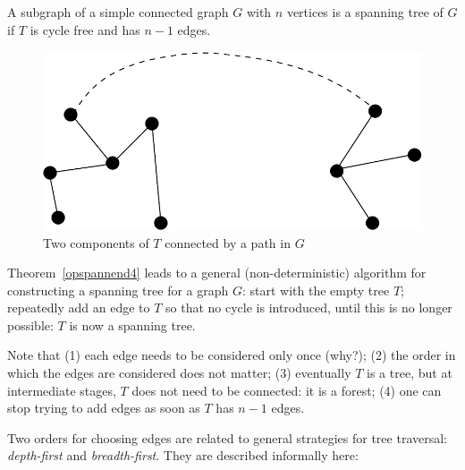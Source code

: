 \begin{eig}
A subgraph of a simple connected graph $G$ with $n$ vertices is a
spanning tree of $G$ if $T$ is cycle free and has $n-1$ edges.
\end{eig}

\begin{figure}[ht]
\begin{center}
\includegraphics[width=0.3\linewidth,keepaspectratio]{opspannend3}
\end{center}
\caption{Two components of $T$ connected by a path in $G$
\label{opspannend3}}
\end{figure}

Theorem~\ref{opspannend4} leads to a general (non-deterministic)
algorithm for constructing a spanning tree for a graph $G$: start with
the empty tree $T$; repeatedly add an edge to $T$ so that no cycle is
introduced, until this is no longer possible: $T$ is now a spanning
tree.

Note that (1) each edge needs to be considered only once (why?); (2)
the order in which the edges are considered does not matter; (3)
eventually $T$ is a tree, but at intermediate stages, $T$ does not
need to be connected: it is a forest; (4) one can stop trying to add
edges as soon as $T$ has $n-1$ edges.

Two orders for choosing edges are related to general strategies for
tree traversal: {\em depth-first} and {\em breadth-first}. They are
described informally here:

